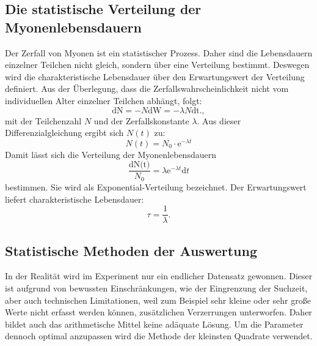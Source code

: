 \subsection{Die statistische Verteilung der Myonenlebensdauern}
Der Zerfall von Myonen ist ein statistischer Prozess. Daher sind die Lebensdauern einzelner Teilchen nicht gleich, sondern über eine Verteilung bestimmt. Deswegen wird die charakteristische Lebensdauer über den Erwartungswert der Verteilung definiert. Aus der Überlegung, dass die Zerfallswahrscheinlichkeit nicht vom individuellen Alter einzelner Teilchen abhängt, folgt:
\begin{equation}
    \text{dN} = -N \text{dW} = - \lambda N \text{dt} \text{.} \label{eq:stat},
\end{equation}
mit der Teilchenzahl $N$ und der Zerfallskonstante $\lambda$. Aus dieser Differenzialgleichung ergibt sich $N(t)$ zu:
\begin{equation}
    N(t) = N_0  \cdot \text{e}^{-\lambda t}
\end{equation}
Damit lässt sich die Verteilung der Myonenlebensdauern
\begin{equation}
    \frac{\text{dN(t)}}{N_0} = \lambda \text{e}^{-\lambda t} \text{d}t  \label{eq:stat2}
\end{equation}
bestimmen.
Sie wird als Exponential-Verteilung bezeichnet. Der Erwartungswert liefert charakteristische Lebensdauer:
\begin{equation}
    \tau = \frac{1}{\lambda}\text{.} \label{eq:stat3}
\end{equation}

\subsection{Statistische Methoden der Auswertung}
In der Realität wird im Experiment nur ein endlicher Datensatz gewonnen. Dieser ist aufgrund von bewussten Einschränkungen, wie der Eingrenzung der Suchzeit, aber auch technischen Limitationen, weil zum Beispiel sehr kleine oder sehr große Werte nicht erfasst werden können, zusätzlichen Verzerrungen unterworfen. Daher bildet auch das arithmetische Mittel keine adäquate Lösung. Um die Parameter dennoch optimal anzupassen wird die Methode der kleinsten Quadrate verwendet.